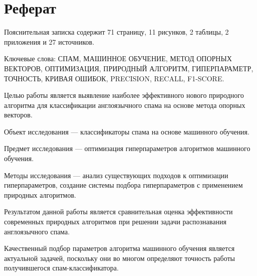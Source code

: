 \chapter*{Реферат}
\thispagestyle{plain}
Пояснительная записка содержит 71 страницу, 11 рисунков, 2 таблицы, 2 приложения и 27 источников.

Ключевые слова: СПАМ, МАШИННОЕ ОБУЧЕНИЕ, МЕТОД ОПОРНЫХ ВЕКТОРОВ, ОПТИМИЗАЦИЯ, 
ПРИРОДНЫЙ АЛГОРИТМ, ГИПЕРПАРАМЕТР, ТОЧНОСТЬ, КРИВАЯ ОШИБОК, PRECISION, RECALL, F1-SCORE.

Целью работы является выявление наиболее эффективного нового природного алгоритма 
для классификации англоязычного спама на основе метода опорных векторов. 

Объект исследования — классификаторы спама на основе машинного обучения. 

Предмет исследования — оптимизация гиперпараметров алгоритмов машинного обучения.

Методы исследования — анализ существующих подходов к оптимизации гиперпараметров, 
создание системы подбора гиперпараметров с применением природных алгоритмов.

Результатом данной работы является сравнительная оценка эффективности современных 
природных алгоритмов при решении задачи распознавания англоязычного спама.

Качественный подбор параметров алгоритма машинного обучения является актуальной задачей, 
поскольку они во многом определяют точность работы получившегося спам-классификатора.
